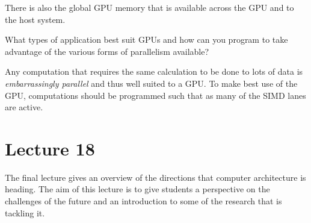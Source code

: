 \documentclass{supervision}
\begin{document}
\begin{questions}
\begin{solution}
    There is also the global GPU memory that is available across the GPU and to the host system.
    \end{solution}

    \question
    What types of application best suit GPUs and how can you program to take advantage of the various forms of parallelism available?
    \begin{solution}
    Any computation that requires the same calculation to be done to lots of data is \textit{embarrassingly parallel} and thus well suited to a GPU. To make best use of the GPU, computations should be programmed such that as many of the SIMD lanes are active.
    \end{solution}

\end{questions}

\section*{Lecture 18}

The final lecture gives an overview of the directions that computer architecture is heading. The aim of this lecture is to give students a perspective on the challenges of the future and an introduction to some of the research that is tackling it.
\end{document}
